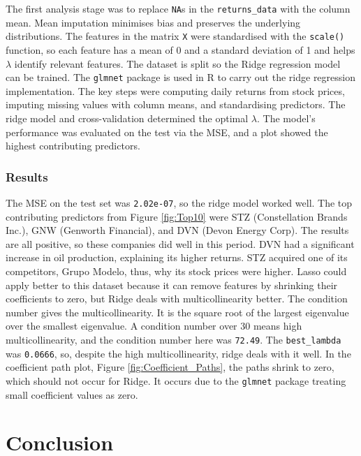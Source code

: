 \documentclass[12pt]{report} %
\begin{document}
The first analysis stage was to replace \texttt{NA}s in the \texttt{returns\_data} with the column mean. Mean imputation minimises bias and preserves the underlying distributions. The features in the matrix \texttt{X} were standardised with the \texttt{scale()} function, so each feature has a mean of 0 and a standard deviation of 1 and helps $\lambda$ identify relevant features. The dataset is split so the Ridge regression model can be trained. The \texttt{glmnet} package is used in R to carry out the ridge regression implementation. The key steps were computing daily returns from stock prices, imputing missing values with column means, and standardising predictors. The ridge model and cross-validation determined the optimal \( \lambda \). The model's performance was evaluated on the test via the MSE, and a plot showed the highest contributing predictors.

\subsection{Results}
The MSE on the test set was \texttt{2.02e-07}, so the ridge model worked well. The top contributing predictors from Figure \ref{fig:Top10} were STZ (Constellation Brands Inc.), GNW (Genworth Financial), and DVN (Devon Energy Corp). The results are all positive, so these companies did well in this period. DVN had a significant increase in oil production, explaining its higher returns. STZ acquired one of its competitors, Grupo Modelo, thus, why its stock prices were higher.\cite{constellation2013} Lasso could apply better to this dataset because it can remove features by shrinking their coefficients to zero, but Ridge deals with multicollinearity better. The condition number gives the multicollinearity. It is the square root of the largest eigenvalue over the smallest eigenvalue.\cite{conditionnumber} A condition number over 30 means high multicollinearity, and the condition number here was \texttt{72.49}. The \texttt{best\_lambda} was \texttt{0.0666}, so, despite the high multicollinearity, ridge deals with it well. In the coefficient path plot, Figure \ref{fig:Coefficient_Paths}, the paths shrink to zero, which should not occur for Ridge. It occurs due to the \texttt{glmnet} package treating small coefficient values as zero. 

\chapter{Conclusion}
\end{document}

